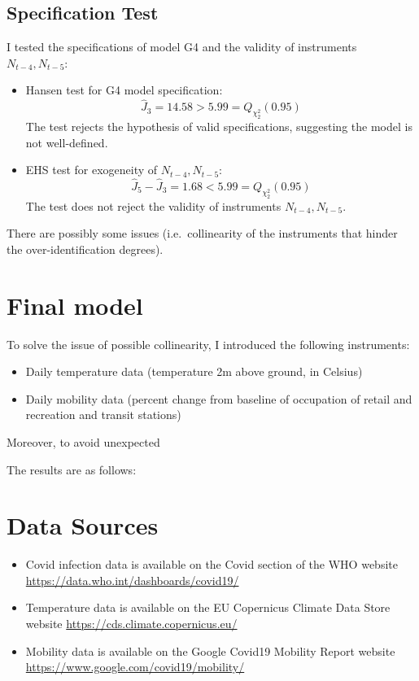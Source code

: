     \subsection{Specification Test}
    I tested the specifications of model G4 and the validity of instruments $N_{t-4}, N_{t-5}$:
    \begin{itemize}
        \item Hansen test for G4 model specification:
            \begin{equation}
                \hat J_3 = 14.58 > 5.99 =Q_{\chi^2_2}(0.95)
            \end{equation}
            The test rejects the hypothesis of valid specifications, suggesting the model is not well-defined.
        \item EHS test for exogeneity of $N_{t-4}, N_{t-5}$:
            \begin{equation}
                \hat J_5 - \hat J_3 = 1.68 < 5.99 =Q_{\chi^2_2}(0.95)
            \end{equation}
            The test does not reject the validity of instruments $N_{t-4}, N_{t-5}$.
    \end{itemize}
    There are possibly some issues (i.e.\ collinearity of the instruments that hinder the over-identification degrees).

    \section{Final model}
    To solve the issue of possible collinearity, I introduced the following instruments:
    \begin{itemize}
        \item Daily temperature data (temperature 2m above ground, in Celsius)
        \item Daily mobility data (percent change from baseline of occupation of retail and recreation and transit stations)
    \end{itemize}

    Moreover, to avoid unexpected

    The results are as follows:
    

    \section{Data Sources}
    \begin{itemize}
        \item Covid infection data is available on the Covid section of the WHO website \url{https://data.who.int/dashboards/covid19/}
        \item Temperature data is available on the EU Copernicus Climate Data Store website \url{https://cds.climate.copernicus.eu/}
        \item Mobility data is available on the Google Covid19 Mobility Report website \url{https://www.google.com/covid19/mobility/}
    \end{itemize}




